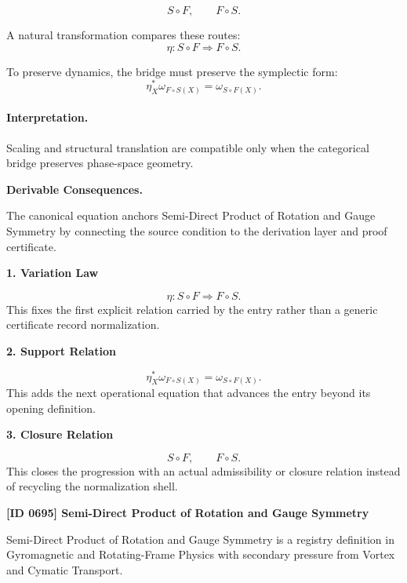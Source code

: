 \begin{equation}
S\circ F,
\qquad
F\circ S.
\end{equation}

A natural transformation compares these routes:
\begin{equation}
\eta:S\circ F\Rightarrow F\circ S.
\end{equation}

To preserve dynamics, the bridge must preserve the symplectic form:
\begin{equation}
\boxed{
\eta_X^{*}\omega_{F\circ S(X)}
=
\omega_{S\circ F(X)}.
}
\end{equation}

\paragraph{Interpretation.}
Scaling and structural translation are compatible only when the categorical bridge preserves phase-space geometry.

\par\vspace{0.35em}
\noindent\textbf{Derivable Consequences.}\quad
\begingroup
\footnotesize
\raggedright
The canonical equation anchors Semi-Direct Product of Rotation and Gauge Symmetry by connecting the source condition to the derivation layer and proof certificate.
\par\endgroup

\noindent\textbf{1. Variation Law}\par
\[
\eta:S\circ F\Rightarrow F\circ S.
\]
\noindent This fixes the first explicit relation carried by the entry rather than a generic certificate record normalization.\par
\noindent\textbf{2. Support Relation}\par
\[
\eta_X^{*}\omega_{F\circ S(X)} = \omega_{S\circ F(X)}.
\]
\noindent This adds the next operational equation that advances the entry beyond its opening definition.\par
\noindent\textbf{3. Closure Relation}\par
\[
S\circ F, \qquad F\circ S.
\]
\noindent This closes the progression with an actual admissibility or closure relation instead of recycling the normalization shell.\par

\clearpage
\noindent\textbf{[ID 0695] Semi-Direct Product of Rotation and Gauge Symmetry}\par
\vspace{0.35em}
\begingroup\small
{}
Semi-Direct Product of Rotation and Gauge Symmetry is a registry definition in Gyromagnetic and Rotating-Frame Physics with secondary pressure from Vortex and Cymatic Transport.


